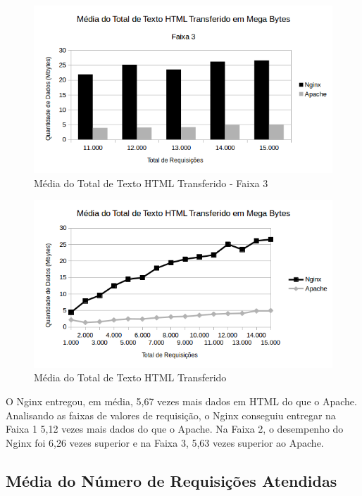 \begin{figure}[H]
	\centering
	\includegraphics[width=1\linewidth]{graficos/grafico3-f3} 
	\caption{Média do Total de Texto HTML Transferido - Faixa 3}
	\label{fig:grafico3-f3}
\end{figure}

\begin{figure}[H]
	\centering
	\includegraphics[width=1\linewidth]{graficos/grafico3} 
	\caption{Média do Total de Texto HTML Transferido}
	\label{fig:grafico3}
\end{figure}

O Nginx entregou, em média, 5,67 vezes mais dados em HTML do que o Apache. 
Analisando as faixas de valores de requisição, o Nginx conseguiu entregar na 
Faixa 1 5,12 vezes mais dados do que o Apache. Na Faixa 2, o desempenho do 
Nginx foi 6,26 vezes superior e na Faixa 3, 5,63 vezes superior ao Apache.

\subsection{Média do Número de Requisições Atendidas}

